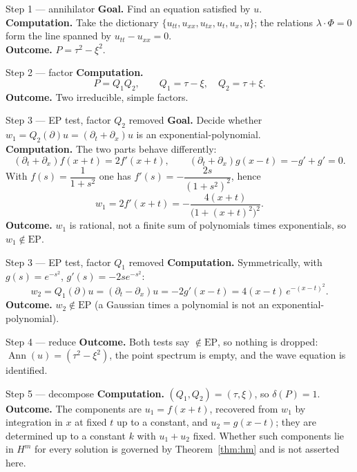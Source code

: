 \documentclass[11pt,a4paper]{article}
\theoremstyle{definition}
\newcommand{\Ann}{\operatorname{Ann}}
\newcommand{\EP}{\mathrm{EP}}
\begin{document}
\begin{wstep}{Step 1 --- annihilator}
\textbf{Goal.} Find an equation satisfied by $u$.\\
\textbf{Computation.} Take the dictionary $\{u_{tt},u_{xx},u_{tx},u_t,u_x,u\}$; the relations $\lambda\cdot\Phi=0$ form the line spanned by $u_{tt}-u_{xx}=0$.\\
\textbf{Outcome.} $P=\tau^2-\xi^2$.
\end{wstep}

\begin{wstep}{Step 2 --- factor}
\textbf{Computation.}
\[
P=Q_1Q_2,\qquad Q_1=\tau-\xi,\quad Q_2=\tau+\xi .
\]
\textbf{Outcome.} Two irreducible, simple factors.
\end{wstep}

\begin{wstep}{Step 3 --- EP test, factor $Q_2$ removed}
\textbf{Goal.} Decide whether $w_1=Q_2(\partial)u=(\partial_t+\partial_x)u$ is an exponential-polynomial.\\
\textbf{Computation.} The two parts behave differently:
\[
(\partial_t+\partial_x)f(x+t)=2f'(x+t),\qquad (\partial_t+\partial_x)g(x-t)=-g'+g'=0 .
\]
With $f(s)=\dfrac1{1+s^2}$ one has $f'(s)=-\dfrac{2s}{(1+s^2)^2}$, hence
\[
w_1=2f'(x+t)=-\frac{4(x+t)}{\big(1+(x+t)^2\big)^2}.
\]
\textbf{Outcome.} $w_1$ is rational, not a finite sum of polynomials times exponentials, so $w_1\notin\EP$.
\end{wstep}

\begin{wstep}{Step 3 --- EP test, factor $Q_1$ removed}
\textbf{Computation.} Symmetrically, with $g(s)=e^{-s^2}$, $g'(s)=-2se^{-s^2}$:
\[
w_2=Q_1(\partial)u=(\partial_t-\partial_x)u=-2g'(x-t)=4(x-t)\,e^{-(x-t)^2}.
\]
\textbf{Outcome.} $w_2\notin\EP$ (a Gaussian times a polynomial is not an exponential-polynomial).
\end{wstep}

\begin{wstep}{Step 4 --- reduce}
\textbf{Outcome.} Both tests say $\notin\EP$, so nothing is dropped: $\Ann(u)=(\tau^2-\xi^2)$, the point spectrum is empty, and the wave equation is identified.
\end{wstep}

\begin{wstep}{Step 5 --- decompose}
\textbf{Computation.} $(Q_1,Q_2)=(\tau,\xi)$, so $\delta(P)=1$.\\
\textbf{Outcome.} The components are $u_1=f(x+t)$, recovered from $w_1$ by integration in $x$ at fixed $t$ up to a constant, and $u_2=g(x-t)$; they are determined up to a constant $k$ with $u_1+u_2$ fixed. Whether such components lie in $H^m$ for every solution is governed by Theorem~\ref{thm:hm} and is not asserted here.
\end{wstep}
\end{document}

